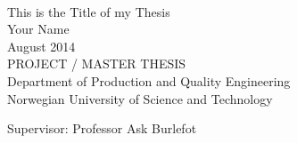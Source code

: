 
\thispagestyle{empty}
\mbox{}\\[6pc]
\begin{center}
\Huge{This is the Title of my Thesis}\\[2pc]

\Large{Your Name}\\[1pc]
\large{August 2014}\\[2pc]

PROJECT / MASTER THESIS\\
Department of Production and Quality Engineering\\
Norwegian University of Science and Technology
\end{center}
\vfill

\noindent Supervisor: Professor Ask Burlefot


